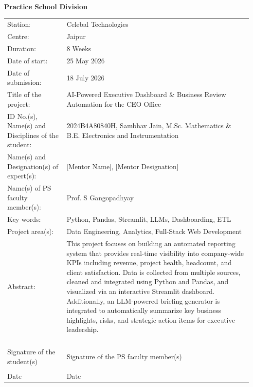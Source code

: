\documentclass{book}
\begin{document}
    
    \centerline{\bf Practice School Division}
\vspace*{0.5cm}

\begin{center}
    \begin{tabular}{@{}p{5.5cm} p{9.5cm}@{}}
    
    Station: & Celebal Technologies \\[0.5cm]
    
    Centre: & Jaipur \\[0.5cm]
    
    Duration: & 8 Weeks \\[0.5cm]
    
    Date of start: & 25 May 2026 \\[0.5cm]
    
    Date of submission: & 18 July 2026 \\[0.5cm]
    
    Title of the project: & AI-Powered Executive Dashboard \& Business Review Automation for the CEO Office \\[0.5cm]
    
    ID No.(s), Name(s) and Disciplines of the student: & 2024B4A80840H, Sambhav Jain, M.Sc. Mathematics \& B.E. Electronics and Instrumentation \\[0.5cm]
    
    Name(s) and Designation(s) of expert(s): & [Mentor Name], [Mentor Designation] \\[0.5cm]
    
    Name(s) of PS faculty member(s): & Prof. S Gangopadhyay \\[0.5cm]
    
    Key words: & Python, Pandas, Streamlit, LLMs, Dashboarding, ETL \\[0.5cm]
    
    Project area(s): & Data Engineering, Analytics, Full-Stack Web Development \\[0.5cm]
    
    Abstract: & This project focuses on building an automated reporting system that provides real-time visibility into company-wide KPIs including revenue, project health, headcount, and client satisfaction. Data is collected from multiple sources, cleaned and integrated using Python and Pandas, and visualized via an interactive Streamlit dashboard. Additionally, an LLM-powered briefing generator is integrated to automatically summarize key business highlights, risks, and strategic action items for executive leadership. \\
    			& \\
			& \\
			& \\
			& \\
			Signature of the student(s) & \hspace*{1cm}Signature of the PS faculty member(s) \\
			& \\
			Date & \hspace*{1cm}Date \\ %
    \end{tabular}
\end{center}
\end{document}
